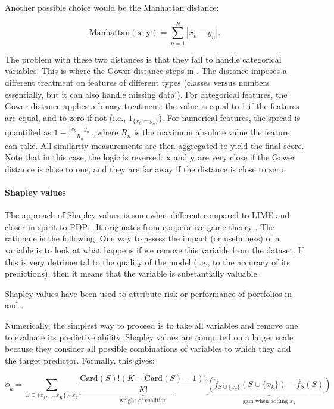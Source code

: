 Another possible choice would be the Manhattan distance:

\begin{equation}
\text{Manhattan}(\textbf{x}, \textbf{y})=\sum_{n=1}^N|x_n-y_n|.
\end{equation}

The problem with these two distances is that they fail to handle categorical variables. This is where the Gower distance steps in \citep{gower1971general}. The distance imposes a different treatment on features of different types (classes versus numbers essentially, but it can also handle missing data!). For categorical features, the Gower distance applies a binary treatment: the value is equal to 1 if the features are equal, and to zero if not (i.e., $1_{\{x_n=y_n\}}$). For numerical features, the spread is quantified as $1 -\frac{|x_n -y_n|}{R_n}$, where $R_n$ is the maximum absolute value the feature can take. All similarity measurements are then aggregated to yield the final score. Note that in this case, the logic is reversed: $\textbf{x}$ and $\textbf{y}$ are very close if the Gower distance is close to one, and they are far away if the distance is close to zero.

\paragraph{Shapley values}

The approach of Shapley values is somewhat different compared to LIME and closer in spirit to PDPs. It originates from cooperative game theory \citep{shapley1953value}. The rationale is the following. One way to assess the impact (or usefulness) of a variable is to look at what happens if we remove this variable from the dataset. If this is very detrimental to the quality of the model (i.e., to the accuracy of its predictions), then it means that the variable is substantially valuable.

Shapley values have been used to attribute risk or performance of portfolios in \cite{shalit2020shapley} and \cite{moehle2021portfolio}.

Numerically, the simplest way to proceed is to take all variables and remove one to evaluate its predictive ability. Shapley values are computed on a larger scale because they consider all possible combinations of variables to which they add the target predictor. Formally, this gives:

\begin{equation}
\label{eq:shapley}
\phi_k=\sum_{S \subseteq \{x_1,\dots,x_K \} \backslash x_k}\underbrace{\frac{\text{Card}(S)!(K-\text{Card}(S)-1)!}{K!}}_{\text{weight of coalition}}\underbrace{\left(\hat{f}_{S \cup \{x_k\}}(S \cup \{x_k\})-\hat{f}_S(S)\right)}_{\text{gain when adding } x_k}
\end{equation}

